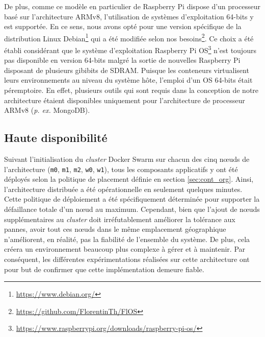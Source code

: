 De plus, comme ce modèle en particulier de Raspberry Pi dispose d'un processeur basé sur l'architecture ARMv8, l'utilisation de systèmes d'exploitation 64-bits y est supportée. En ce sens, nous avons opté pour une version spécifique de la distribution Linux Debian\footnote{\url{https://www.debian.org/}} qui a été modifiée selon nos besoins\footnote{\url{https://github.com/FlorentinTh/FlOS}}. Ce choix a été établi considérant que le système d'exploitation Raspberry Pi OS\footnote{\url{https://www.raspberrypi.org/downloads/raspberry-pi-os/}} n'est toujours pas disponible en version 64-bits malgré la sortie de nouvelles Raspberry Pi disposant de plusieurs gibibits de SDRAM. Puisque les conteneurs virtualisent leurs environnements au niveau du système hôte, l'emploi d'un \acs{OS} 64-bits était péremptoire. En effet, plusieurs outils qui sont requis dans la conception de notre architecture étaient disponibles uniquement pour l'architecture de processeur ARMv8 (\textit{p. ex.} MongoDB).

\subsection{Haute disponibilité}

Suivant l'initialisation du \textit{cluster} Docker Swarm sur chacun des cinq n\oe{}uds de l'architecture (\texttt{m0}, \texttt{m1}, \texttt{m2}, \texttt{w0}, \texttt{w1}), tous les composants applicatifs y ont été déployés selon la politique de placement définie en section \ref{sec:cont_org}. Ainsi, l'architecture distribuée a été opérationnelle en seulement quelques minutes. Cette politique de déploiement a été spécifiquement déterminée pour supporter la défaillance totale d'un n\oe{}ud au maximum. Cependant, bien que l'ajout de n\oe{}uds supplémentaires au \textit{cluster} doit irréfutablement améliorer la tolérance aux pannes, avoir tout ces n\oe{}uds dans le même emplacement géographique n'améliorent, en réalité, pas la fiabilité de l'ensemble du système. De plus, cela créera un environnement beaucoup plus complexe à gérer et à maintenir. Par conséquent, les différentes expérimentations réalisées sur cette architecture ont pour but de confirmer que cette implémentation demeure fiable.


